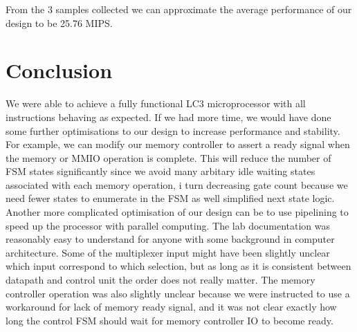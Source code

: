 \documentclass[a4paper,12pt]{report}
\begin{document}
From the 3 samples collected we can approximate the average performance of our design to be 25.76 MIPS.
\section{Conclusion}
We were able to achieve a fully functional LC3 microprocessor with all instructions behaving as expected. If we had more time, we would have done some further optimisations to our design to increase performance and stability. For example, we can  modify our memory controller to assert a ready signal when the memory or MMIO operation is complete. This will reduce the number of FSM states significantly since we avoid many arbitary idle waiting states associated with each memory operation, i turn decreasing gate count because we need fewer states to enumerate in the FSM as well simplified next state logic. Another more complicated optimisation of our design can be to use pipelining to speed up the processor with parallel computing.\newline
The lab documentation was reasonably easy to understand for anyone with some background in computer architecture. Some of the multiplexer input might have been slightly unclear which input correspond to which selection, but as long as it is consistent between datapath and control unit the order does not really matter. The memory controller operation was also slightly unclear because we were instructed to use a workaround for lack of memory ready signal, and it was not clear exactly how long the control FSM should wait for memory controller IO to become ready. 
\end{document}
